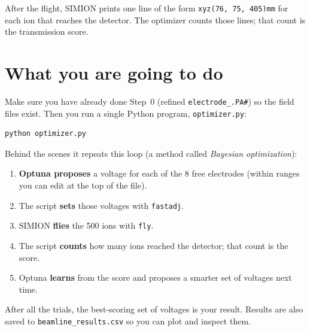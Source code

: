 \documentclass[11pt]{article}
\begin{document}
After the flight, SIMION prints one line of the form
\texttt{xyz(76, 75, 405)mm} for each ion that reaches the detector. The
optimizer counts those lines; that count is the transmission score.

\section{What you are going to do}

Make sure you have already done Step~0 (refined \texttt{electrode\_.PA\#}) so the
field files exist. Then you run a single Python program,
\texttt{optimizer.py}:

\begin{lstlisting}[style=shell]
python optimizer.py
\end{lstlisting}

\noindent Behind the scenes it repeats this loop (a method called
\emph{Bayesian optimization}):

\begin{enumerate}[nosep]
  \item \textbf{Optuna proposes} a voltage for each of the 8 free electrodes
        (within ranges you can edit at the top of the file).
  \item The script \textbf{sets} those voltages with \texttt{fastadj}.
  \item SIMION \textbf{flies} the 500 ions with \texttt{fly}.
  \item The script \textbf{counts} how many ions reached the detector; that
        count is the score.
  \item Optuna \textbf{learns} from the score and proposes a smarter set of
        voltages next time.
\end{enumerate}

After all the trials, the best-scoring set of voltages is your result. Results
are also saved to \texttt{beamline\_results.csv} so you can plot and inspect
them.
\end{document}
